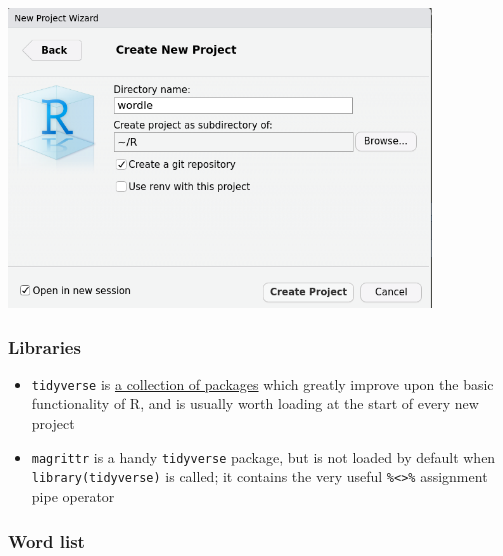 \documentclass[
]{article}
\newenvironment{Shaded}{\begin{snugshade}}{\end{snugshade}}
\newcommand{\FunctionTok}[1]{\textcolor[rgb]{0.00,0.00,0.00}{#1}}
\newcommand{\NormalTok}[1]{#1}
\newcommand{\SpecialCharTok}[1]{\textcolor[rgb]{0.00,0.00,0.00}{#1}}
\newcommand{\StringTok}[1]{\textcolor[rgb]{0.31,0.60,0.02}{#1}}
\begin{document}
\hypertarget{section}{%
\subsubsection{\texorpdfstring{\protect\includegraphics[width=4.41667in,height=\textheight]{images/project_settings.png}}{}}\label{section}}

\hypertarget{libraries}{%
\subsubsection{Libraries}\label{libraries}}

\begin{itemize}
\item
  \texttt{tidyverse} is \href{https://www.tidyverse.org/packages/}{a
  collection of packages} which greatly improve upon the basic
  functionality of R, and is usually worth loading at the start of every
  new project
\item
  \texttt{magrittr} is a handy \texttt{tidyverse} package, but is not
  loaded by default when
  \texttt{library(\textquotesingle{}tidyverse\textquotesingle{})} is
  called; it contains the very useful
  \texttt{\%\textless{}\textgreater{}\%} assignment pipe operator
\end{itemize}

\hypertarget{word-list}{%
\subsubsection{Word list}\label{word-list}}

\begin{Shaded}
\end{Shaded}
\end{document}
